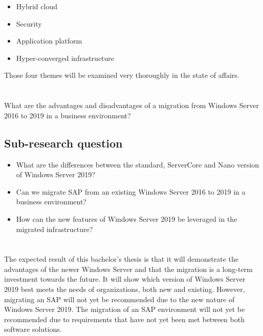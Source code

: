\begin{itemize}
	\item Hybrid cloud
	\item Security
	\item Application platform
	\item Hyper-converged infrastructure
\end{itemize}

Those four themes will be examined very thoroughly in the state of affairs.

\section{}
\label{sec:onderzoeksvraag}
What are the advantages and disadvantages of a migration from Windows Server 2016 to 2019 in a business environment?

\subsection{Sub-research question}

\begin{itemize}
	\item What are the differences between the standard, ServerCore and Nano version of Windows Server 2019?
	\item Can we migrate SAP from an existing Windows Server 2016 to 2019 in a business environment?
	\item How can the new features of Windows Server 2019 be leveraged in the migrated infrastructure? 
\end{itemize}

\section{}
\label{sec:onderzoeksdoelstelling}

The expected result of this bachelor's thesis is that it will demonstrate the advantages of the newer Windows Server and that the migration is a long-term investment towards the future. It will show which version of Windows Server 2019 best meets the needs of organizations, both new and existing. However, migrating an SAP will not yet be recommended due to the new nature of Windows Server 2019. The migration of an SAP environment will not yet be recommended due to requirements that have not yet been met between both software solutions. 

